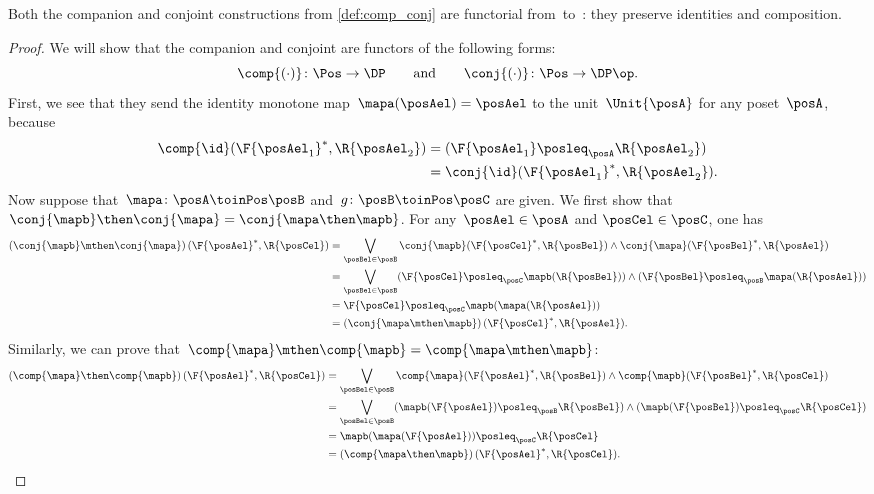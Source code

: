 \begin{lemma}
    \label{lem:comp_conj}
    Both the companion and conjoint constructions from \cref{def:comp_conj} are functorial from~\Pos to~\DP: they preserve identities and composition.
\end{lemma}
\begin{proof}
    We will show that the companion and conjoint are functors of the following forms:
    \begin{equation}
        \comp{(\cdot)}\colon\Pos\to\DP
        \qquad\text{and}\qquad
        \conj{(\cdot)}\colon\Pos\to\DP\op.
    \end{equation}
    First, we see that they send the identity monotone map~$\mapa(\posAel)=\posAel$ to the unit~$\Unit{\posA }$ for any poset~$\posA $, because
    \begin{equation}
        \begin{aligned}
            \comp{\id}(\F{\posAel_1}^*,\R{\posAel_2})&= (\F{\posAel_1} \posleq_{\posA} \R{\posAel_2})\\
            &=\conj{\id}(\F{\posAel_1}^*,\R{\posAel_2}).
        \end{aligned}
    \end{equation}
    Now suppose that~$\mapa\colon  \posA \toinPos \posB $ and~$g\colon \posB \toinPos \posC$ are given. We first show that $\conj{\mapb}\then\conj{\mapa}=\conj{\mapa\then \mapb}$.
    For any~$\posAel\in \posA$ and $\posCel\in \posC$, one has
    \begin{equation}
        \begin{aligned}
            \left(\conj{\mapb}\mthen \conj{\mapa}\right)(\F{\posAel}^*,\R{\posCel})
            &=\bigvee_{\posBel\in \posB} \conj{\mapb}(\F{\posCel}^*,\R{\posBel})\wedge\conj{\mapa}(\F{\posBel}^*,\R{\posAel})\\
            &=\bigvee_{\posBel\in \posB} (\F{\posCel}\posleq_\posC \mapb(\R{\posBel})) \wedge (\F{\posBel}\posleq_\posB \mapa(\R{\posAel})) \\
            &= \F{\posCel}\posleq_\posC \mapb(\mapa(\R{\posAel}))\\
            &=\left(\conj{\mapa\mthen \mapb}\right)(\F{\posCel}^*,\R{\posAel}).
        \end{aligned}
    \end{equation}
    Similarly, we can prove that~$\comp{\mapa}\mthen \comp{\mapb}=\comp{\mapa\mthen \mapb}$:
    \begin{equation}
        \begin{aligned}
            \left(\comp{\mapa}\then \comp{\mapb}\right)(\F{\posAel}^*,\R{\posCel})&=\bigvee_{\posBel\in \posB} \comp{\mapa}(\F{\posAel}^*,\R{\posBel})\wedge\comp{\mapb}(\F{\posBel}^*,\R{\posCel})\\%
            &=\bigvee_{\posBel\in \posB} (\mapb(\F{\posAel})\posleq_\posB \R{\posBel})\wedge (\mapb(\F{\posBel})\posleq_\posC \R{\posCel})\\
            &=\mapb(\mapa(\F{\posAel}))\posleq_\posC \R{\posCel}\\
            &=\left(\comp{\mapa\then \mapb}\right)(\F{\posAel}^*,\R{\posCel}).
        \end{aligned}
    \end{equation}
\end{proof}

